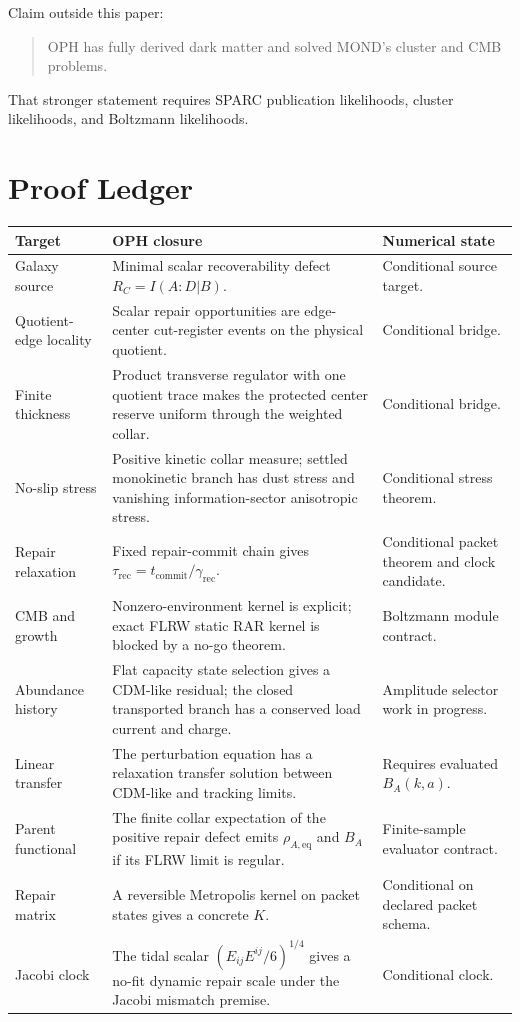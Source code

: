 \documentclass[11pt]{article}
\begin{document}
Claim outside this paper:
\begin{quote}
OPH has fully derived dark matter and solved MOND's cluster and CMB problems.
\end{quote}
That stronger statement requires SPARC publication likelihoods, cluster
likelihoods, and Boltzmann likelihoods.

\section{Proof Ledger}

\begin{center}
\begin{tabularx}{\textwidth}{@{}p{}Xp{}@{}}
\toprule
Target & OPH closure & Numerical state \\
\midrule
Galaxy source & Minimal scalar recoverability defect
\(R_C=I(A:D|B)\). & Conditional source target. \\
Quotient-edge locality & Scalar repair opportunities are edge-center
cut-register events on the physical quotient. & Conditional bridge. \\
Finite thickness & Product transverse regulator with one quotient trace makes
the protected center reserve uniform through the weighted collar. &
Conditional bridge. \\
No-slip stress & Positive kinetic collar measure; settled monokinetic branch
has dust stress and vanishing information-sector anisotropic stress. &
Conditional stress theorem. \\
Repair relaxation & Fixed repair-commit chain gives
\(\tau_{\mathrm{rec}}=t_{\mathrm{commit}}/\gamma_{\mathrm{rec}}\). &
Conditional packet theorem and clock candidate. \\
CMB and growth & Nonzero-environment kernel is explicit; exact FLRW static
RAR kernel is blocked by a no-go theorem. &
Boltzmann module contract. \\
Abundance history & Flat capacity state selection gives a CDM-like residual;
the closed transported branch has a conserved load current and charge. &
Amplitude selector work in progress. \\
Linear transfer & The perturbation equation has a relaxation transfer
solution between CDM-like and tracking limits. & Requires evaluated
\(B_A(k,a)\). \\
Parent functional & The finite collar expectation of the positive repair
defect emits \(\rho_{A,\mathrm{eq}}\) and \(B_A\) if its FLRW limit is
regular. & Finite-sample evaluator contract. \\
Repair matrix & A reversible Metropolis kernel on packet states gives a
concrete \(K\). & Conditional on declared packet schema. \\
Jacobi clock & The tidal scalar \((E_{ij}E^{ij}/6)^{1/4}\) gives a no-fit
dynamic repair scale under the Jacobi mismatch premise. & Conditional clock. \\
\bottomrule
\end{tabularx}
\end{center}
\end{document}
